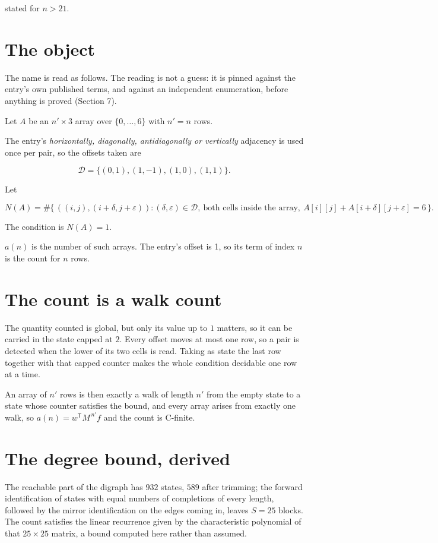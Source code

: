 \documentclass[11pt]{article}
\theoremstyle{definition}
\begin{document}
stated for $n > 21$.

\section{The object}

The name is read as follows. The reading is not a guess: it is pinned against the entry's own published terms, and against an independent enumeration, before anything is proved (Section 7).

Let $A$ be an $n' \times 3$ array over $\{0,\dots,6\}$ with $n' = n$ rows.

The entry's {\itshape horizontally, diagonally, antidiagonally or vertically} adjacency is used once per pair, so the offsets taken are

\[\mathcal{D} = \{(0,1), (1,-1), (1,0), (1,1)\}.\]

Let

\[N(A) = \#\bigl\{\,((i,j),(i{+}\delta,j{+}\varepsilon)) : (\delta,\varepsilon) \in \mathcal{D},\ \text{both cells inside the array},\ A[i][j] + A[i{+}\delta][j{+}\varepsilon] = 6\,\bigr\}.\]

The condition is $N(A) = 1$.

$a(n)$ is the number of such arrays. The entry's offset is 1, so its term of index $n$ is the count for $n$ rows.

\section{The count is a walk count}

The quantity counted is global, but only its value up to $1$ matters, so it can be carried in the state capped at $2$. Every offset moves at most one row, so a pair is detected when the lower of its two cells is read. Taking as state the last row together with that capped counter makes the whole condition decidable one row at a time.

An array of $n'$ rows is then exactly a walk of length $n'$ from the empty state to a state whose counter satisfies the bound, and every array arises from exactly one walk, so $a(n) = w^{\mathsf T}M^{\,n'}f$ and the count is C-finite.

\section{The degree bound, derived}

The reachable part of the digraph has $932$ states, $589$ after trimming; the forward identification of states with equal numbers of completions of every length, followed by the mirror identification on the edges coming in, leaves $S = 25$ blocks. The count satisfies the linear recurrence given by the characteristic polynomial of that $25\times25$ matrix, a bound computed here rather than assumed.
\end{document}
